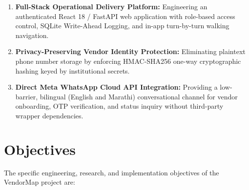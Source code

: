 \begin{enumerate}
    \item \textbf{Full-Stack Operational Delivery Platform:} Engineering an authenticated React 18 / FastAPI web application with role-based access control, SQLite Write-Ahead Logging, and in-app turn-by-turn walking navigation.
    \item \textbf{Privacy-Preserving Vendor Identity Protection:} Eliminating plaintext phone number storage by enforcing HMAC-SHA256 one-way cryptographic hashing keyed by institutional secrets.
    \item \textbf{Direct Meta WhatsApp Cloud API Integration:} Providing a low-barrier, bilingual (English and Marathi) conversational channel for vendor onboarding, OTP verification, and status inquiry without third-party wrapper dependencies.
\end{enumerate}

\section{Objectives}
\label{sec:objectives}

The specific engineering, research, and implementation objectives of the VendorMap project are:

